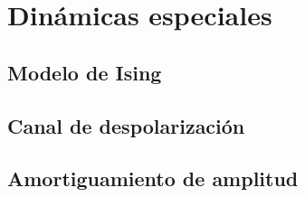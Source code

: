 \section{Dinámicas especiales}

\subsection{Modelo de Ising}

\subsection{Canal de despolarización}

\subsection{Amortiguamiento de amplitud}